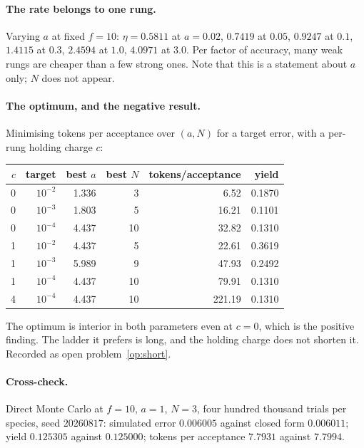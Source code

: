 \documentclass[11pt]{article}
\theoremstyle{plain}
\theoremstyle{definition}
\theoremstyle{remark}
\begin{document}
\paragraph{The rate belongs to one rung.}
Varying $a$ at fixed $f = 10$: $\eta = 0.5811$ at $a = 0.02$, $0.7419$ at
$0.05$, $0.9247$ at $0.1$, $1.4115$ at $0.3$, $2.4594$ at $1.0$, $4.0971$ at
$3.0$. Per factor of accuracy, many weak rungs are cheaper than a few strong
ones. Note that this is a statement about $a$ only; $N$ does not appear.

\paragraph{The optimum, and the negative result.}
Minimising tokens per acceptance over $(a, N)$ for a target error, with a
per-rung holding charge $c$:

\begin{center}
\begin{tabular}{@{}rrrrrr@{}}
\toprule
$c$ & target & best $a$ & best $N$ & tokens/acceptance & yield \\
\midrule
0 & $10^{-2}$ & 1.336 & 3 & 6.52 & 0.1870 \\
0 & $10^{-3}$ & 1.803 & 5 & 16.21 & 0.1101 \\
0 & $10^{-4}$ & 4.437 & 10 & 32.82 & 0.1310 \\
1 & $10^{-2}$ & 4.437 & 5 & 22.61 & 0.3619 \\
1 & $10^{-3}$ & 5.989 & 9 & 47.93 & 0.2492 \\
1 & $10^{-4}$ & 4.437 & 10 & 79.91 & 0.1310 \\
4 & $10^{-4}$ & 4.437 & 10 & 221.19 & 0.1310 \\
\bottomrule
\end{tabular}
\end{center}

The optimum is interior in both parameters even at $c = 0$, which is the
positive finding. The ladder it prefers is long, and the holding charge does
not shorten it. Recorded as open problem~\ref{op:short}.

\paragraph{Cross-check.}
Direct Monte Carlo at $f = 10$, $a = 1$, $N = 3$, four hundred thousand trials
per species, seed $20260817$: simulated error $0.006005$ against closed form
$0.006011$; yield $0.125305$ against $0.125000$; tokens per acceptance
$7.7931$ against $7.7994$.
\end{document}

